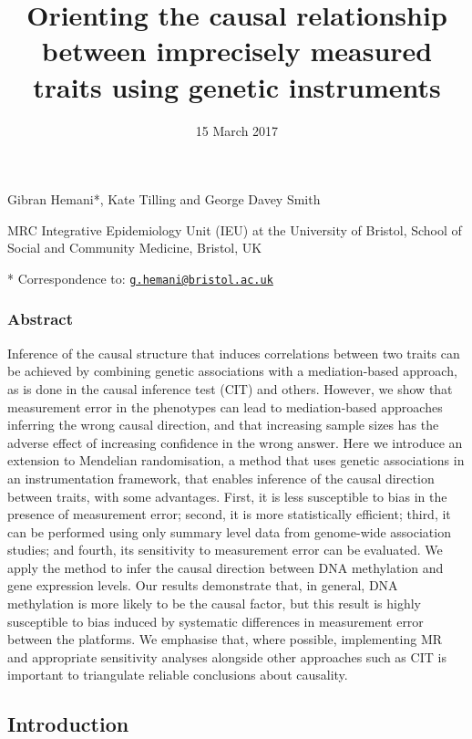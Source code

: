 \documentclass[]{article}
\title{Orienting the causal relationship between imprecisely measured traits
using genetic instruments}
\author{}
\date{15 March 2017}
\begin{document}
\maketitle

Gibran Hemani*, Kate Tilling and George Davey Smith

MRC Integrative Epidemiology Unit (IEU) at the University of Bristol,
School of Social and Community Medicine, Bristol, UK

* Correspondence to:
\href{mailto:g.hemani@bristol.ac.uk}{\nolinkurl{g.hemani@bristol.ac.uk}}

\subsubsection{Abstract}\label{abstract}

Inference of the causal structure that induces correlations between two
traits can be achieved by combining genetic associations with a
mediation-based approach, as is done in the causal inference test (CIT)
and others. However, we show that measurement error in the phenotypes
can lead to mediation-based approaches inferring the wrong causal
direction, and that increasing sample sizes has the adverse effect of
increasing confidence in the wrong answer. Here we introduce an
extension to Mendelian randomisation, a method that uses genetic
associations in an instrumentation framework, that enables inference of
the causal direction between traits, with some advantages. First, it is
less susceptible to bias in the presence of measurement error; second,
it is more statistically efficient; third, it can be performed using
only summary level data from genome-wide association studies; and
fourth, its sensitivity to measurement error can be evaluated. We apply
the method to infer the causal direction between DNA methylation and
gene expression levels. Our results demonstrate that, in general, DNA
methylation is more likely to be the causal factor, but this result is
highly susceptible to bias induced by systematic differences in
measurement error between the platforms. We emphasise that, where
possible, implementing MR and appropriate sensitivity analyses alongside
other approaches such as CIT is important to triangulate reliable
conclusions about causality.

\subsection{Introduction}\label{introduction}
\end{document}
